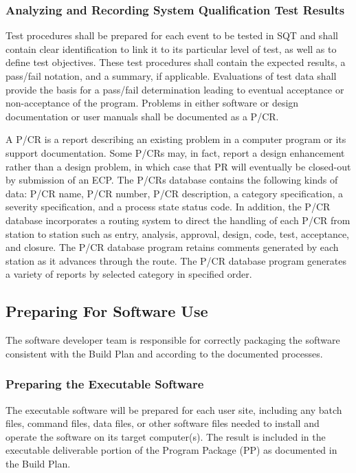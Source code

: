 \documentclass[a4paper, 11pt]{article}
\begin{document}
\subsubsection{Analyzing and Recording System Qualification Test Results}
Test procedures shall be prepared for each event to be tested in SQT and shall contain clear identification to link it to its particular level of test, as well as to define test objectives. These test procedures shall contain the expected results, a pass/fail notation, and a summary, if
applicable. Evaluations of test data shall provide the basis for a pass/fail determination leading to eventual acceptance or non-acceptance of the program. Problems in either software or design documentation or user manuals shall be documented as a P/CR.

A P/CR is a report describing an existing problem in a computer program or its support documentation. Some P/CRs may, in fact, report a design enhancement rather than a design problem, in which case that PR will eventually be closed-out by submission of an ECP. The P/CRs database contains the following kinds of data: P/CR name, P/CR number, P/CR
description, a category specification, a severity specification, and a process state status code. In addition, the P/CR database incorporates a routing system to direct the handling of each P/CR from station to station such as entry, analysis, approval, design, code, test, acceptance, and closure. The P/CR database program retains comments generated by each station as it advances through the route. The P/CR database program generates a variety of reports by selected category
in specified order.

\subsection{Preparing For Software Use}\label{install}
The software developer team is responsible for correctly packaging the software consistent with the Build Plan and according to the documented processes.

\subsubsection{Preparing the Executable Software}
The executable software will be prepared for each user site, including any batch files, command files, data files, or other software files needed to install and operate the software on its target computer(s). The result is included in the executable deliverable portion of the Program Package (PP) as documented in the Build Plan.
\end{document}
